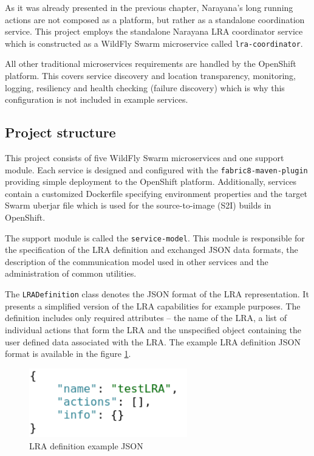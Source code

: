 \documentclass[oneside,
  digital, %
  table,   %
  lof,     %
  lot,     %
]{fithesis3}
\begin{document}
As it was already presented in the previous chapter, Narayana's long running actions are not composed as a platform, but rather as a standalone coordination service. This project employs the standalone Narayana LRA coordinator service which is constructed as a WildFly Swarm microservice called \texttt{lra-coordinator}. 

All other traditional microservices requirements are handled by the OpenShift platform. This covers service discovery and location transparency, monitoring, logging, resiliency and health checking (failure discovery) which is why this configuration is not included in example services.


\subsection{Project structure}

This project consists of five WildFly Swarm microservices and one support module. Each service is designed and configured with the \texttt{fabric8-maven-plugin} providing simple deployment to the OpenShift platform. Additionally, services contain a customized Dockerfile specifying environment properties and the target Swarm uberjar file which is used for the source-to-image (S2I) builds in OpenShift.

The support module is called the \texttt{service-model}. This module is responsible for the specification of the LRA definition and exchanged JSON data formats, the description of the communication model used in other services and the administration of common utilities.

The \texttt{LRADefinition} class denotes the JSON format of the LRA representation. It presents a simplified version of the LRA capabilities for example purposes. The definition includes only required attributes -- the name of the LRA, a list of individual actions that form the LRA and the unspecified object containing the user defined data associated with the LRA. The example LRA definition JSON format is available in the figure \ref{fig:lra-json}.

\begin{figure}[h]
    \begin{center}
        \includegraphics[height=30mm]{images/LRADefinition.png}
    \end{center}
    \caption{LRA definition example JSON}
    \label{fig:lra-json}
\end{figure}
\end{document}
